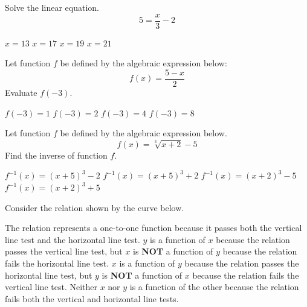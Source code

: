 \documentclass[12pt]{exam}
\begin{document}
\begin{questions}

\question Solve the linear equation.
$$5=\frac{x}{3}-2$$
\begin{choices} 
	\choice $x=13$
	\choice $x=17$
	\choice $x=19$
	\correctchoice $x=21$ 
\end{choices}

\vfill

\question Let function $f$ be defined by the algebraic expression below:
$$f(x)=\frac{5-x}{2}$$
Evaluate $f(-3)$.
\begin{choices} 
	\choice $f(-3)=1$
	\choice $f(-3)=2$
	\correctchoice $f(-3)=4$
	\choice $f(-3)=8$ 
\end{choices}

\vfill


\question Let function $f$ be defined by the algebraic expression below.
$$f(x)=\sqrt[3]{x+2}-5$$
Find the inverse of function $f$.
\begin{choices} 
	\correctchoice $f^{-1}(x)=(x+5)^3-2$
	\choice $f^{-1}(x)=(x+5)^3+2$
	\choice $f^{-1}(x)=(x+2)^3-5$
	\choice $f^{-1}(x)=(x+2)^3+5$
\end{choices}

\vfill

\newpage

\question Consider the relation shown by the curve below.


\begin{choices} 
	\choice The relation represents a one-to-one function because it passes both the vertical line test and the horizontal line test.
	\correctchoice $y$ is a function of $x$ because the relation passes the vertical line test, but $x$ is {\bf NOT} a function of $y$ because the relation fails the horizontal line test.
	\choice $x$ is a function of $y$ because the relation passes the horizontal line test, but $y$ is {\bf NOT} a function of $x$ because the relation fails the vertical line test.
	\choice Neither $x$ nor $y$ is a function of the other because the relation fails both the vertical and horizontal line tests.
\end{choices}


\end{questions}
\end{document}
